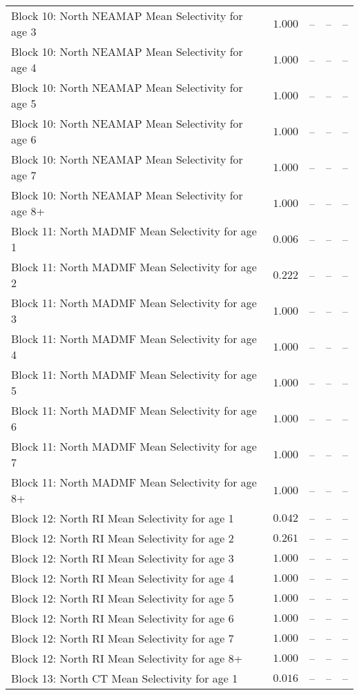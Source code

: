 \documentclass[
]{article}
\begin{document}
\begin{landscape}
\begin{longtable}[t]{lrrrr}
Block 10: North NEAMAP Mean Selectivity for age 3 & $1.000$ & -- & -- & --\\
Block 10: North NEAMAP Mean Selectivity for age 4 & $1.000$ & -- & -- & --\\
Block 10: North NEAMAP Mean Selectivity for age 5 & $1.000$ & -- & -- & --\\
Block 10: North NEAMAP Mean Selectivity for age 6 & $1.000$ & -- & -- & --\\
\addlinespace
Block 10: North NEAMAP Mean Selectivity for age 7 & $1.000$ & -- & -- & --\\
Block 10: North NEAMAP Mean Selectivity for age 8+ & $1.000$ & -- & -- & --\\
Block 11: North MADMF Mean Selectivity for age 1 & $0.006$ & -- & -- & --\\
Block 11: North MADMF Mean Selectivity for age 2 & $0.222$ & -- & -- & --\\
Block 11: North MADMF Mean Selectivity for age 3 & $1.000$ & -- & -- & --\\
\addlinespace
Block 11: North MADMF Mean Selectivity for age 4 & $1.000$ & -- & -- & --\\
Block 11: North MADMF Mean Selectivity for age 5 & $1.000$ & -- & -- & --\\
Block 11: North MADMF Mean Selectivity for age 6 & $1.000$ & -- & -- & --\\
Block 11: North MADMF Mean Selectivity for age 7 & $1.000$ & -- & -- & --\\
Block 11: North MADMF Mean Selectivity for age 8+ & $1.000$ & -- & -- & --\\
\addlinespace
Block 12: North RI Mean Selectivity for age 1 & $0.042$ & -- & -- & --\\
Block 12: North RI Mean Selectivity for age 2 & $0.261$ & -- & -- & --\\
Block 12: North RI Mean Selectivity for age 3 & $1.000$ & -- & -- & --\\
Block 12: North RI Mean Selectivity for age 4 & $1.000$ & -- & -- & --\\
Block 12: North RI Mean Selectivity for age 5 & $1.000$ & -- & -- & --\\
\addlinespace
Block 12: North RI Mean Selectivity for age 6 & $1.000$ & -- & -- & --\\
Block 12: North RI Mean Selectivity for age 7 & $1.000$ & -- & -- & --\\
Block 12: North RI Mean Selectivity for age 8+ & $1.000$ & -- & -- & --\\
Block 13: North CT Mean Selectivity for age 1 & $0.016$ & -- & -- & --\\

\end{longtable}
\end{landscape}
\end{document}
